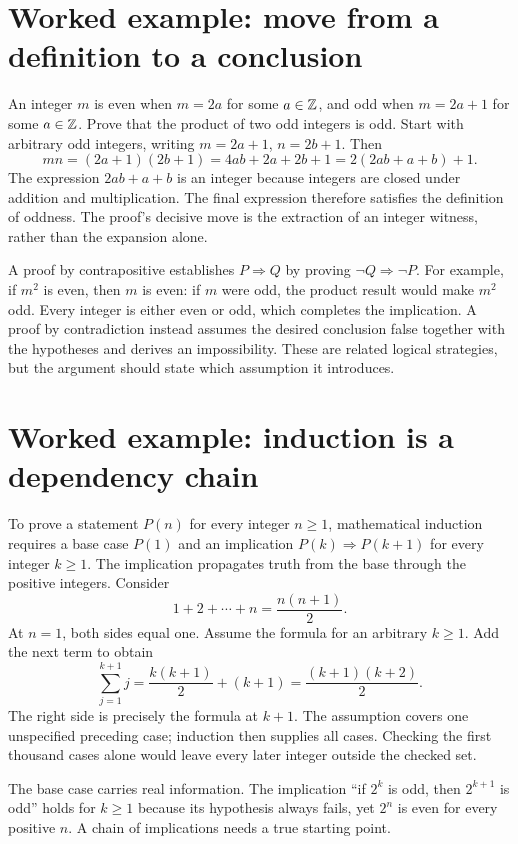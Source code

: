 \section{Worked example: move from a definition to a conclusion}
An integer $m$ is even when $m=2a$ for some $a\in\mathbb{Z}$, and odd when
$m=2a+1$ for some $a\in\mathbb{Z}$. Prove that the product of two odd integers
is odd. Start with arbitrary odd integers, writing $m=2a+1$, $n=2b+1$.
Then
\[
 mn=(2a+1)(2b+1)=4ab+2a+2b+1=2(2ab+a+b)+1.
\]
The expression $2ab+a+b$ is an integer because integers are closed under
addition and multiplication. The final expression therefore satisfies the
definition of oddness. The proof's decisive move is the extraction of an
integer witness, rather than the expansion alone.

A proof by contrapositive establishes $P\Rightarrow Q$ by proving
$\neg Q\Rightarrow\neg P$. For example, if $m^2$ is even, then $m$ is even:
if $m$ were odd, the product result would make $m^2$ odd. Every integer
is either even or odd, which completes the implication. A proof by
contradiction instead assumes the desired conclusion false together with
the hypotheses and derives an impossibility. These are related logical
strategies, but the argument should state which assumption it introduces.

\section{Worked example: induction is a dependency chain}
To prove a statement $P(n)$ for every integer $n\geq1$, mathematical
induction requires a base case $P(1)$ and an implication
$P(k)\Rightarrow P(k+1)$ for every integer $k\geq1$. The implication
propagates truth from the base through the positive integers.
Consider
\[
 1+2+\cdots+n=\frac{n(n+1)}2.
\]
At $n=1$, both sides equal one. Assume the formula for an arbitrary
$k\geq1$. Add the next term to obtain
\[
 \sum_{j=1}^{k+1}j=\frac{k(k+1)}2+(k+1)
 =\frac{(k+1)(k+2)}2.
\]
The right side is precisely the formula at $k+1$. The assumption covers
one unspecified preceding case; induction then supplies all cases.
Checking the first thousand cases alone would leave every later integer
outside the checked set.

The base case carries real information. The implication
``if $2^k$ is odd, then $2^{k+1}$ is odd'' holds for $k\geq1$ because
its hypothesis always fails, yet $2^n$ is even for every positive $n$.
A chain of implications needs a true starting point.

